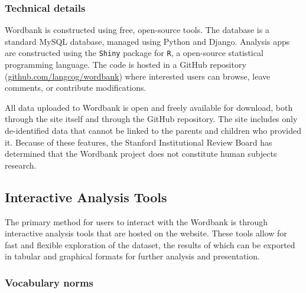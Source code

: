 \documentclass[doc,noapacite]{apa2}
\begin{document}
\subsubsection{Technical details}

Wordbank is constructed using free, open-source tools. The database is a standard MySQL database, managed using Python and Django. Analysis apps are constructed using the \texttt{Shiny} package for \texttt{R}, a open-source statistical programming language.  The code is hosted in a GitHub repository (\url{github.com/langcog/wordbank}) where interested users can browse, leave comments, or contribute modifications. 

All data uploaded to Wordbank is open and freely available for download, both through the site itself and through the GitHub repository. The site includes only de-identified data that cannot be linked to the parents and children who provided it. Because of these features, the Stanford Institutional Review Board has determined that the Wordbank project does not constitute human subjects research.

\subsection{Interactive Analysis Tools}

The primary method for users to interact with the Wordbank is through interactive analysis tools that are hosted on the website. These tools allow for fast and flexible exploration of the dataset, the results of which can be exported in tabular and graphical formats for further analysis and presentation. 

\subsubsection{Vocabulary norms}
\end{document}
